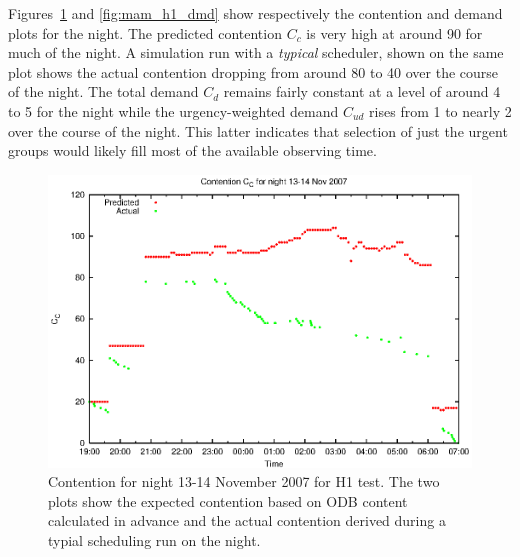 Figures~\ref{fig:mam_h1_contention} and \ref{fig:mam_h1_dmd} show respectively the contention and demand plots for the night. The predicted contention $C_c$ is very high at around 90 for much of the night. A simulation run with a \emph{typical} scheduler, shown on the same plot shows the actual contention dropping from around 80 to 40 over the course of the night. The total demand $C_d$ remains fairly constant at a level of around 4 to 5 for the night while the urgency-weighted demand $C_{ud}$ rises from 1 to nearly 2 over the course of the night. This latter indicates that selection of just the urgent groups would likely fill most of the available observing time.

\begin{figure}[htbp]
\begin{center}
    \includegraphics[scale=1.0, angle=0]{figures/mam/cont.eps}
\end{center}
\caption[Contention for night 13-14 November 2007.]
{Contention for night 13-14 November 2007 for H1 test. The two plots show the expected contention based on ODB content calculated in advance and the actual contention derived during a typial scheduling run on the night.}
\label{fig:mam_h1_contention}
\end{figure}

